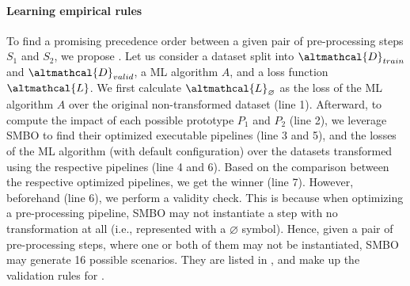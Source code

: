 
\paragraph{Learning empirical rules}
To find a promising precedence order between a given pair of pre-processing steps $S_1$ and $S_2$, we propose .
Let us consider a dataset split into $\altmathcal{D}_{train}$ and $\altmathcal{D}_{valid}$, a ML algorithm $A$, and a loss function $\altmathcal{L}$.
We first calculate $\altmathcal{L}_{\varnothing}$ as the loss of the ML algorithm $A$ over the original non-transformed dataset (line 1). %
Afterward, to compute the impact of each possible prototype $P_1$ and $P_2$ (line 2),
we leverage SMBO to find their optimized executable pipelines (line 3 and 5), and the losses of the ML algorithm (with default configuration) over the datasets transformed using the respective pipelines (line 4 and 6).
Based on the comparison between the respective optimized pipelines, we get the winner (line 7).
However, beforehand (line 6), we perform a validity check.
This is because when optimizing a pre-processing pipeline, SMBO may not instantiate a step with no transformation at all (i.e., represented with a $\varnothing$ symbol).
Hence, given a pair of pre-processing steps, where one or both of them may not be instantiated, SMBO may generate 16 possible scenarios.
They are listed in , and make up the validation rules for .

